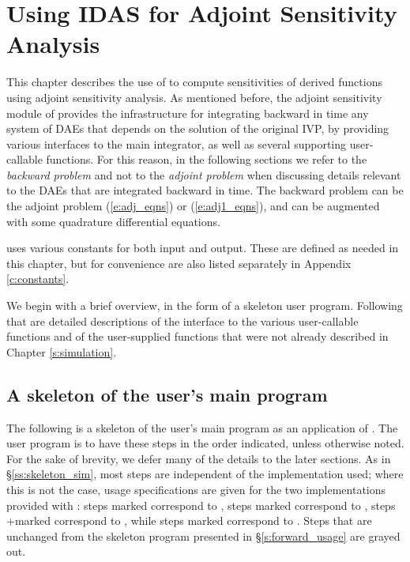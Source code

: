 \chapter{Using IDAS for Adjoint Sensitivity Analysis}\label{s:adjoint}

This chapter describes the use of {\idas} to compute sensitivities of derived 
functions using adjoint sensitivity analysis. As mentioned before, the adjoint
sensitivity module of {\idas} provides the infrastructure for integrating
backward in time any system of DAEs that depends on the solution of the original
IVP, by providing various interfaces to the main {\idas} integrator, as well 
as several supporting user-callable functions. For this reason, in the following
sections we refer to the {\em backward problem} and not to the 
{\em adjoint problem} when discussing details relevant to the DAEs that
are integrated backward in  time. The backward problem can be the adjoint problem
(\ref{e:adj_eqns}) or (\ref{e:adj1_eqns}), and
can be augmented with some quadrature differential equations.

{\idas} uses various constants for both input and output.  These are
defined as needed in this chapter, but for convenience are also listed
separately in Appendix \ref{c:constants}.

We begin with a brief overview, in the form of a skeleton user program.
Following that are detailed descriptions of the interface to the
various user-callable functions and of the user-supplied functions that were
not already described in Chapter \ref{s:simulation}.

\section{A skeleton of the user's main program}
\label{ss:skeleton_adj}

The following is a skeleton of the user's main program as an application of
{\idas}. The user program is to have these steps in the order indicated, 
unless otherwise noted. For the sake of brevity, we defer many of the details to 
the later sections.
As in \S\ref{ss:skeleton_sim}, most steps are independent of the {\nvector}
implementation used; where this is not the case, usage specifications are given for
the two implementations provided with {\idas}: steps marked {\p} correspond to 
{\nvecp}, steps marked {\omp} correspond to {\nvecopenmp}, steps
+marked {\pt} correspond to {\nvecpthreads}, while steps marked {\s}
correspond to {\nvecs}. 
Steps that are unchanged from the skeleton program presented in
\S\ref{s:forward_usage} are grayed out.


